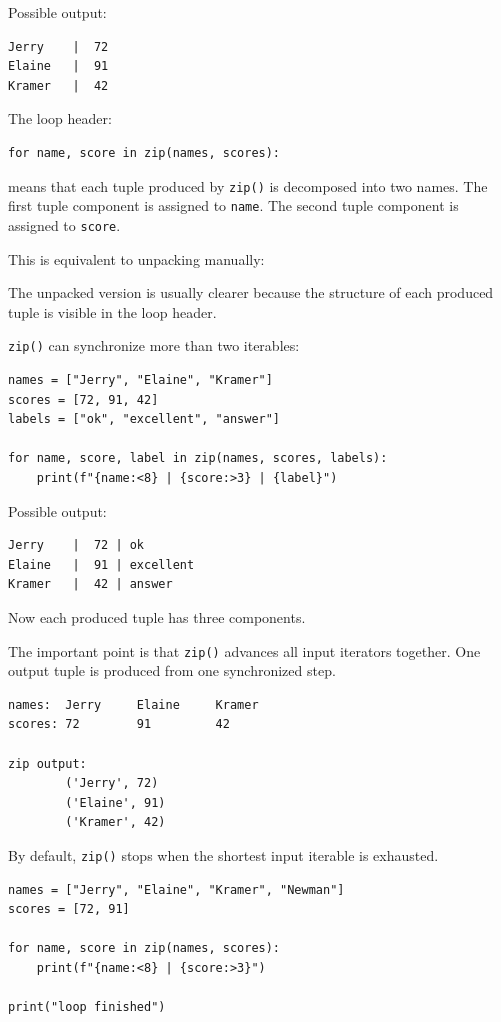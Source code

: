 Possible output:

\begin{verbatim}
Jerry    |  72
Elaine   |  91
Kramer   |  42
\end{verbatim}

The loop header:

\begin{verbatim}
for name, score in zip(names, scores):
\end{verbatim}

means that each tuple produced by \texttt{zip()} is decomposed into two names. The first tuple component is assigned to \texttt{name}. The second tuple component is assigned to \texttt{score}.

This is equivalent to unpacking manually:

The unpacked version is usually clearer because the structure of each produced tuple is visible in the loop header.

\texttt{zip()} can synchronize more than two iterables:

\begin{verbatim}
names = ["Jerry", "Elaine", "Kramer"]
scores = [72, 91, 42]
labels = ["ok", "excellent", "answer"]

for name, score, label in zip(names, scores, labels):
    print(f"{name:<8} | {score:>3} | {label}")
\end{verbatim}

Possible output:

\begin{verbatim}
Jerry    |  72 | ok
Elaine   |  91 | excellent
Kramer   |  42 | answer
\end{verbatim}

Now each produced tuple has three components.

The important point is that \texttt{zip()} advances all input iterators together. One output tuple is produced from one synchronized step.

\begin{verbatim}
names:  Jerry     Elaine     Kramer
scores: 72        91         42

zip output:
        ('Jerry', 72)
        ('Elaine', 91)
        ('Kramer', 42)
\end{verbatim}

By default, \texttt{zip()} stops when the shortest input iterable is exhausted.

\begin{verbatim}
names = ["Jerry", "Elaine", "Kramer", "Newman"]
scores = [72, 91]

for name, score in zip(names, scores):
    print(f"{name:<8} | {score:>3}")

print("loop finished")
\end{verbatim}

